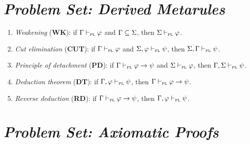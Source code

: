 \documentclass[a4paper, 11pt]{article} %
\begin{document}
\section*{\it Problem Set: Derived Metarules}

\begin{enumerate}[itemsep=2pt]\small
	\item \textit{Weakening} (\textbf{WK}): if $\Gamma \vdash_{\textsc{pl}} \varphi$ and $\Gamma \subseteq \Sigma$, then $\Sigma \vdash_{\textsc{pl}} \varphi$.
  \item \textit{Cut elimination} (\textbf{CUT}): if $\Gamma \vdash_{\textsc{pl}} \varphi$ and $\Sigma, \varphi \vdash_{\textsc{pl}} \psi$, then $\Sigma,\Gamma \vdash_{\textsc{pl}} \psi$.
	\item \textit{Principle of detachment} (\textbf{PD}): if $\Gamma \vdash_{\textsc{pl}} \varphi \rightarrow \psi$ and $\Sigma \vdash_{\textsc{pl}} \varphi$, then $\Gamma, \Sigma \vdash_{\textsc{pl}} \psi$.
  \item \textit{Deduction theorem} (\textbf{DT}): if $\Gamma, \varphi \vdash_{\textsc{pl}} \psi$, then $\Gamma \vdash_{\textsc{pl}} \varphi \rightarrow \psi$.
	\item \textit{Reverse deduction} (\textbf{RD}): if $\Gamma \vdash_{\textsc{pl}} \varphi \rightarrow \psi$, then $\Gamma, \varphi \vdash_{\textsc{pl}} \psi$.
\end{enumerate}



\section*{\it Problem Set: Axiomatic Proofs}
\end{document}
